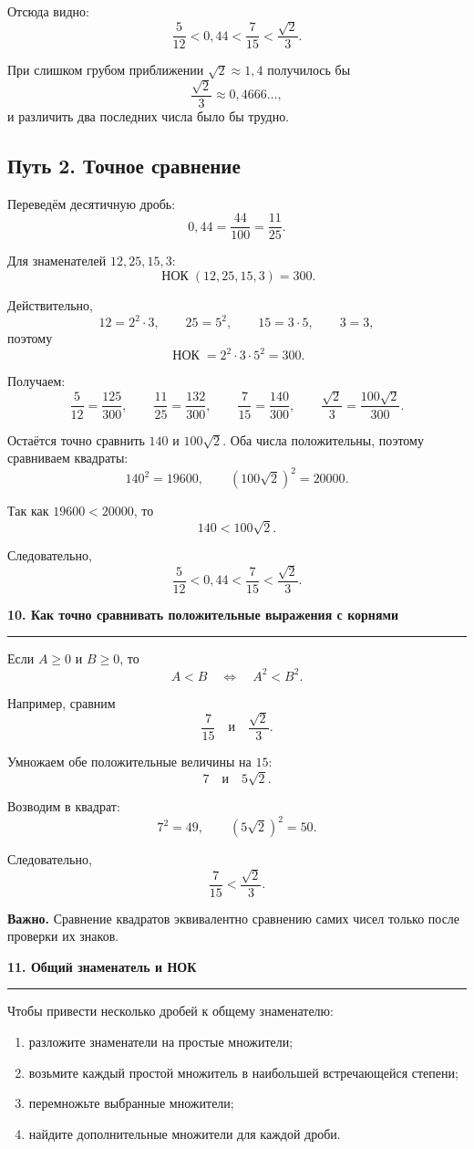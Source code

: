 \documentclass[a4paper,12pt]{article}
\newcommand{\topic}[1]{%
    \vspace{0.7em}
    {\large\bfseries\color{darkaccent}#1}\par
    \vspace{0.25em}
    {\color{rulegray}\hrule}
    \vspace{0.65em}
}
\newcommand{\important}[1]{{\bfseries\color{darkaccent}#1}}
\begin{document}
Отсюда видно:
\[
\frac5{12}<0{,}44<\frac7{15}<\frac{\sqrt2}{3}.
\]

При слишком грубом приближении \(\sqrt2\approx1{,}4\) получилось бы
\[
\frac{\sqrt2}{3}\approx0{,}4666\ldots,
\]
и различить два последних числа было бы трудно.

\subsection*{\color{darkaccent}Путь 2. Точное сравнение}

Переведём десятичную дробь:
\[
0{,}44=\frac{44}{100}=\frac{11}{25}.
\]

Для знаменателей \(12,25,15,3\):
\[
\operatorname{НОК}(12,25,15,3)=300.
\]

Действительно,
\[
12=2^2\cdot3,
\qquad
25=5^2,
\qquad
15=3\cdot5,
\qquad
3=3,
\]
поэтому
\[
\operatorname{НОК}=2^2\cdot3\cdot5^2=300.
\]

Получаем:
\[
\frac5{12}=\frac{125}{300},
\qquad
\frac{11}{25}=\frac{132}{300},
\qquad
\frac7{15}=\frac{140}{300},
\qquad
\frac{\sqrt2}{3}=\frac{100\sqrt2}{300}.
\]

Остаётся точно сравнить \(140\) и \(100\sqrt2\). Оба числа положительны, поэтому сравниваем квадраты:
\[
140^2=19600,
\qquad
(100\sqrt2)^2=20000.
\]

Так как \(19600<20000\), то
\[
140<100\sqrt2.
\]

Следовательно,
\[
\boxed{\frac5{12}<0{,}44<\frac7{15}<\frac{\sqrt2}{3}}.
\]

\topic{10. Как точно сравнивать положительные выражения с корнями}

Если \(A\ge0\) и \(B\ge0\), то
\[
A<B\quad\Longleftrightarrow\quad A^2<B^2.
\]

Например, сравним
\[
\frac7{15}\quad\text{и}\quad\frac{\sqrt2}{3}.
\]

Умножаем обе положительные величины на \(15\):
\[
7\quad\text{и}\quad5\sqrt2.
\]

Возводим в квадрат:
\[
7^2=49,
\qquad
(5\sqrt2)^2=50.
\]

Следовательно,
\[
\boxed{\frac7{15}<\frac{\sqrt2}{3}}.
\]

\important{Важно.}
Сравнение квадратов эквивалентно сравнению самих чисел только после проверки их знаков.

\topic{11. Общий знаменатель и НОК}

Чтобы привести несколько дробей к общему знаменателю:
\begin{enumerate}
    \item разложите знаменатели на простые множители;
    \item возьмите каждый простой множитель в наибольшей встречающейся степени;
    \item перемножьте выбранные множители;
    \item найдите дополнительные множители для каждой дроби.
\end{enumerate}
\end{document}
